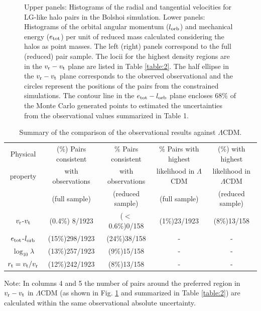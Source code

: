 \documentclass{emulateapj}
\begin{document}
\begin{figure}
\begin{center}
\caption{Upper panels: Histograms of the radial and tangential
  velocities for LG-like halo pairs in the Bolshoi simulation.   Lower
  panels: Histograms of the orbital angular momentum ($l_{\rm orb}$)
  and mechanical energy ($e_{\rm tot}$) per unit of reduced mass
  calculated considering the halos as point masses. The left (right) panels
  correspond to the full (reduced) pair sample. The locii for the highest
  density regions are in the $v_{\rm r}-v_{\rm t}$ plane are listed in
  Table \ref{table:2}. 
  The half ellipse in the $v_{\rm r}-v_{\rm t}$ plane corresponds to
  the observed observational and the circles represent the positions
  of the pairs from the constrained simulations. The contour line in
  the $e_{\rm tot}-l_{\rm orb}$ plane encloses $68\%$ of the Monte
  Carlo generated points to estimated the uncertainties from the
  observational values summarized in Table  1.}
\label{fig:rt}
\end{center}

\end{figure}


\begin{table}
\caption{Summary of the comparison of the observational results
  against $\Lambda$CDM.}
\begin{center}
\begin{tabular}{ccccc}\hline
Physical & (\%) Pairs consistent & \% Pairs consistent & \% Pairs
with highest & (\%) with highest\\ 
property & with observations & with observations & likelihood in
$\Lambda$CDM & likelihood in $\Lambda$CDM\\ 
 & (full sample) & (reduced sample) & (full sample) & (reduced sample)\\ \hline
$v_{\rm r}$-$v_{\rm t}$ & (0.4\%) 8/1923 & ($<$0.6\%)0/158 & (1\%)23/1923 & (8\%)13/158\\
$e_{\rm tot}$-$l_{\rm orb}$ & (15\%)298/1923 & (24\%)38/158 & - & -\\
$\log_{10}\lambda$ & (13\%)257/1923 & (9\%)15/158 & - & -\\
$r_{\rm t}=v_{\rm t}/v_{\rm r}$& (12\%)242/1923 & (8\%)13/158 & -& -\\\hline
\end{tabular}
\end{center}
\vspace{1mm}
Note: In columns 4 and 5 the number of pairs around the preferred region
in $v_{\rm r}-v_{\rm t}$ in $\Lambda$CDM (as shown in
Fig. \ref{fig:rt} and summarized in Table \ref{table:2}) are
calculated within the same observational absolute uncertainty.
\label{table:3}
\end{table}
\end{document}
